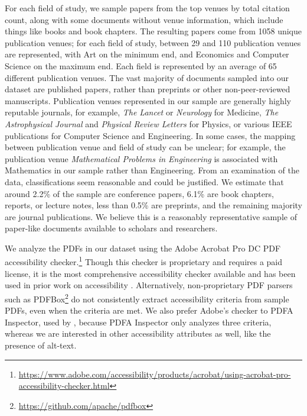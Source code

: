 For each field of study, we sample papers from the top venues by total citation count, along with some documents without venue information, which include things like books and book chapters. The resulting papers come from 1058 unique publication venues; for each field of study, between 29 and 110 publication venues are represented, with Art on the minimum end, and Economics and Computer Science on the maximum end. Each field is represented by an average of 65 different publication venues. The vast majority of documents sampled into our dataset are published papers, rather than preprints or other non-peer-reviewed manuscripts. Publication venues represented in our sample are generally highly reputable journals, for example, \textit{The Lancet} or \textit{Neurology} for Medicine, \textit{The Astrophysical Journal} and \textit{Physical Review Letters} for Physics, or various IEEE publications for Computer Science and Engineering. In some cases, the mapping between publication venue and field of study can be unclear; for example, the publication venue \textit{Mathematical Problems in Engineering} is associated with Mathematics in our sample rather than Engineering. From an examination of the data, classifications seem reasonable and could be justified. We estimate that around 2.2\% of the sample are conference papers, 6.1\% are book chapters, reports, or lecture notes, less than 0.5\% are preprints, and the remaining majority are journal publications. We believe this is a reasonably representative sample of paper-like documents available to scholars and researchers.

We analyze the PDFs in our dataset using the Adobe Acrobat Pro DC PDF accessibility checker.\footnote{\href{https://www.adobe.com/accessibility/products/acrobat/using-acrobat-pro-accessibility-checker.html}{https://www.adobe.com/accessibility/products/acrobat/using-acrobat-pro-accessibility-checker.html}} Though this checker is proprietary and requires a paid license, it is the most comprehensive accessibility checker available and has been used in prior work on accessibility \citep{Lazar2017MakingTF, Ribera2019PublishingAP, Nganji2015ThePD}. Alternatively, non-proprietary PDF parsers such as PDFBox\footnote{\url{https://github.com/apache/pdfbox}} do not consistently extract accessibility criteria from sample PDFs, even when the criteria are met. We also prefer Adobe's checker to PDFA Inspector, used by \citet{Brady2015CreatingAP}, because PDFA Inspector only analyzes three criteria, whereas we are interested in other accessibility attributes as well, like the presence of alt-text.

